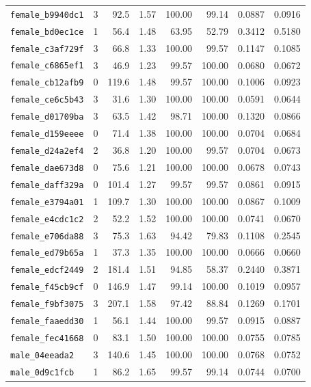 \begin{longtable}{lrrrrrrr}
\texttt{female\_b9940dc1} & 3 & 92.5 & 1.57 & 100.00 & 99.14 & 0.0887 & 0.0916 \\
\texttt{female\_bd0ec1ce} & 1 & 56.4 & 1.48 & 63.95 & 52.79 & 0.3412 & 0.5180 \\
\texttt{female\_c3af729f} & 3 & 66.8 & 1.33 & 100.00 & 99.57 & 0.1147 & 0.1085 \\
\texttt{female\_c6865ef1} & 3 & 46.9 & 1.23 & 99.57 & 100.00 & 0.0680 & 0.0672 \\
\texttt{female\_cb12afb9} & 0 & 119.6 & 1.48 & 99.57 & 100.00 & 0.1006 & 0.0923 \\
\texttt{female\_ce6c5b43} & 3 & 31.6 & 1.30 & 100.00 & 100.00 & 0.0591 & 0.0644 \\
\texttt{female\_d01709ba} & 3 & 63.5 & 1.42 & 98.71 & 100.00 & 0.1320 & 0.0866 \\
\texttt{female\_d159eeee} & 0 & 71.4 & 1.38 & 100.00 & 100.00 & 0.0704 & 0.0684 \\
\texttt{female\_d24a2ef4} & 2 & 36.8 & 1.20 & 100.00 & 99.57 & 0.0704 & 0.0673 \\
\texttt{female\_dae673d8} & 0 & 75.6 & 1.21 & 100.00 & 100.00 & 0.0678 & 0.0743 \\
\texttt{female\_daff329a} & 0 & 101.4 & 1.27 & 99.57 & 99.57 & 0.0861 & 0.0915 \\
\texttt{female\_e3794a01} & 1 & 109.7 & 1.30 & 100.00 & 100.00 & 0.0867 & 0.1009 \\
\texttt{female\_e4cdc1c2} & 2 & 52.2 & 1.52 & 100.00 & 100.00 & 0.0741 & 0.0670 \\
\texttt{female\_e706da88} & 3 & 75.3 & 1.63 & 94.42 & 79.83 & 0.1108 & 0.2545 \\
\texttt{female\_ed79b65a} & 1 & 37.3 & 1.35 & 100.00 & 100.00 & 0.0666 & 0.0660 \\
\texttt{female\_edcf2449} & 2 & 181.4 & 1.51 & 94.85 & 58.37 & 0.2440 & 0.3871 \\
\texttt{female\_f45cb9cf} & 0 & 146.9 & 1.47 & 99.14 & 100.00 & 0.1019 & 0.0957 \\
\texttt{female\_f9bf3075} & 3 & 207.1 & 1.58 & 97.42 & 88.84 & 0.1269 & 0.1701 \\
\texttt{female\_faaedd30} & 1 & 56.1 & 1.44 & 100.00 & 99.57 & 0.0915 & 0.0887 \\
\texttt{female\_fec41668} & 0 & 83.1 & 1.50 & 100.00 & 100.00 & 0.0755 & 0.0785 \\
\texttt{male\_04eeada2} & 3 & 140.6 & 1.45 & 100.00 & 100.00 & 0.0768 & 0.0752 \\
\texttt{male\_0d9c1fcb} & 1 & 86.2 & 1.65 & 99.57 & 99.14 & 0.0744 & 0.0700 \\

\end{longtable}
